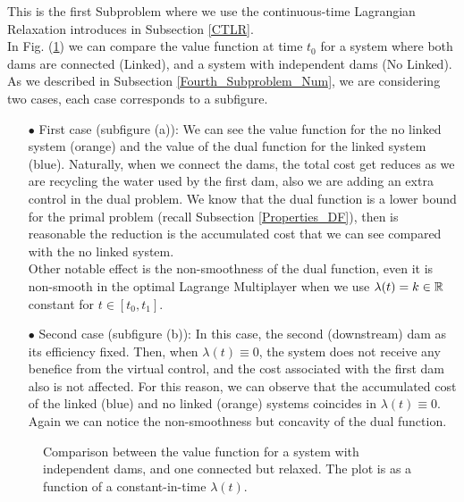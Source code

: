 This is the first Subproblem where we use the continuous-time Lagrangian Relaxation introduces in Subsection \ref{CTLR}.\\

In Fig. (\ref{Plot_SP4_1}) we can compare the value function at time $t_0$ for a system where both dams are connected (Linked), and a system with independent dams (No Linked). As we described in Subsection \ref{Fourth_Subproblem_Num}, we are considering two cases, each case corresponds to a subfigure.

\begin{enumerate}

\item[$\bullet$]First case (subfigure (a)): We can see the value function for the no linked system (orange) and the value of the dual function for the linked system (blue). Naturally, when we connect the dams, the total cost get reduces as we are recycling the water used by the first dam, also we are adding an extra control in the dual problem. We know that the dual function is a lower bound for the primal problem (recall Subsection \ref{Properties_DF}), then is reasonable the reduction is the accumulated cost that we can see compared with the no linked system.\\
Other notable effect is the non-smoothness of the dual function, even it is non-smooth in the optimal Lagrange Multiplayer when we use $\lambda(t)=k\in\mathbb{R}$ constant for $t\in[t_0,t_1]$.

\item[$\bullet$] Second case (subfigure (b)): In this case, the second (downstream) dam as its efficiency fixed. Then, when $\lambda(t)\equiv0$, the system does not receive any benefice from the virtual control, and the cost associated with the first dam also is not affected. For this reason, we can observe that the accumulated cost of the linked (blue) and no linked (orange) systems coincides in $\lambda(t)\equiv0$.\\
Again we can notice the non-smoothness but concavity of the dual function.

\end{enumerate}

\begin{figure}[H]
\centering
{}\quad
{}
\caption{Comparison between the value function for a system with independent dams, and one connected but relaxed. The plot is as a function of a constant-in-time $\lambda(t)$.}
\label{Plot_SP4_1}
\end{figure}

